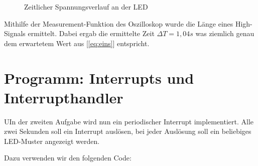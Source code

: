 \documentclass{article}
\begin{document}
\begin{figure}[h]
    \centering
    \caption{Zeitlicher Spannungsverlauf an der LED}
\end{figure}

Mithilfe der Measurement-Funktion des Oszilloskop wurde die Länge eines High-Signals ermittelt. Dabei ergab die ermittelte Zeit $\Delta T = 1,04s$ was ziemlich genau dem erwartetem Wert aus [\ref{eq:eins}] entspricht.

\newpage

\section{Programm: Interrupts und Interrupthandler}


\begin{task}
  UIn der zweiten Aufgabe wird nun ein periodischer Interrupt implementiert. Alle zwei Sekunden soll ein Interrupt auslösen, bei jeder Auslösung soll ein beliebiges LED-Muster angezeigt werden.
\end{task}

Dazu verwenden wir den folgenden Code:
\end{document}
